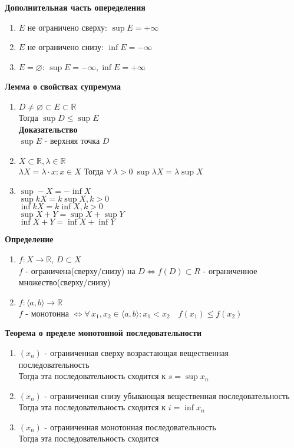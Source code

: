 \documentclass[12pt]{article}
\begin{document}
\textbf{Дополнительная часть опеределения}
\begin{enumerate}
    \item $E$ не ограничено сверху: $\sup E = +\infty$
    \item $E$ не ограничено снизу: $\inf E = -\infty$
    \item $E = \varnothing$: $\sup E = -\infty, \inf E = +\infty$
\end{enumerate}
\textbf{Лемма о свойствах супремума}
\begin{enumerate}
    \item $D\neq\varnothing \subset E \subset \mathbb{R}$\\
    Тогда $\sup D \leq \sup E$\\
    \textbf{Доказательство}\\
    $\sup E$ - верхняя точка $D$
    \item $X\subset\mathbb{R}, \lambda\in\mathbb{R}$\\
    $\lambda X = {\lambda\cdot x: x \in X}$
    Тогда $\forall\,\lambda>0\ \sup \lambda X = \lambda \sup X$
    \item $\sup -X = -\inf X$\\
    $\sup kX = k\sup X, k > 0$\\
    $\inf kX = k\inf X, k > 0$\\
    $\sup X+Y = \sup X + \sup Y$\\
    $\inf X+Y = \inf X + \inf Y$
\end{enumerate}
\textbf{Определение}
\begin{enumerate}
    \item $f: X \rightarrow \mathbb{R}$, $D \subset X$\\
    $f$ - ограничена(сверху/снизу) на $D \Leftrightarrow f(D) \subset R$ - ограниченное множество(сверху/снизу)
    \item $f: \langle a,b \rangle \rightarrow \mathbb{R}$\\
    $f$ - монотонна $\Leftrightarrow \forall\,x_1,x_2 \in \langle a,b\rangle: x_1 < x_2\quad f(x_1)\leq f(x_2)$
\end{enumerate}
\textbf{Теорема о пределе монотонной последовательности}
\begin{enumerate}
    \item $(x_n)$ - ограниченная сверху возрастающая вещественная последовательность\\
    Тогда эта последовательность сходится к $s = \sup x_n$
    \item $(x_n)$ - ограниченная снизу убывающая вещественная последовательность\\
    Тогда эта последовательность сходится к $i = \inf x_n$
    \item $(x_n)$ - ограниченная монотонная последовательность\\
    Тогда эта последовательность сходится
\end{enumerate}
\end{document}
